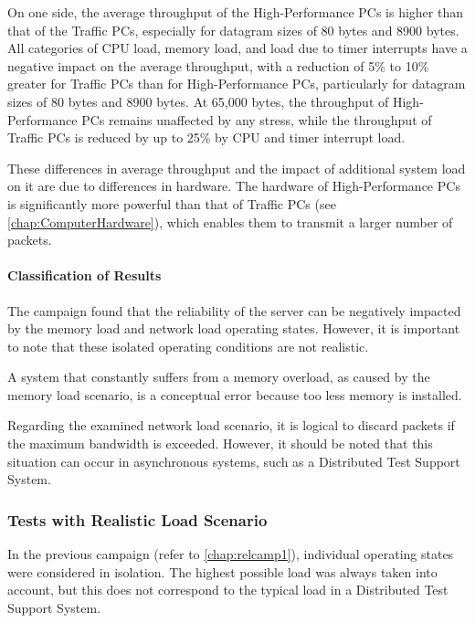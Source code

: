 On one side, the average throughput of the High-Performance PCs is higher than that of the Traffic PCs, especially for datagram sizes of 80 bytes and 8900 bytes. All categories of CPU load, memory load, and load due to timer interrupts have a negative impact on the average throughput, with a reduction of 5\% to 10\% greater for Traffic PCs than for High-Performance PCs, particularly for datagram sizes of 80 bytes and 8900 bytes.  At 65,000 bytes, the throughput of High-Performance PCs remains unaffected by any stress, while the throughput of Traffic PCs is reduced by up to 25\% by CPU and timer interrupt load.

These differences in average throughput and the impact of additional system load on it are due to differences in hardware. The hardware of High-Performance PCs is significantly more powerful than that of Traffic PCs (see \ref{chap:ComputerHardware}), which enables them to transmit a larger number of packets.

\paragraph{Classification of Results}
The campaign found that the reliability of the server can be negatively impacted by the memory load and network load operating states. However, it is important to note that these isolated operating conditions are not realistic.

A system that constantly suffers from a memory overload, as caused by the memory load scenario, is a conceptual error because too less memory is installed.

Regarding the examined network load scenario, it is logical to discard packets if the maximum bandwidth is exceeded. However, it should be noted that this situation can occur in asynchronous systems, such as a Distributed Test Support System.

\subsubsection{Tests with Realistic Load Scenario} \label{chap:campaignloadscen}
In the previous campaign (refer to \ref{chap:relcamp1}), individual operating states were considered in isolation. The highest possible load was always taken into account, but this does not correspond to the typical load in a Distributed Test Support System.

